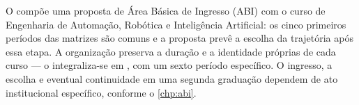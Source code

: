 O \ppccurso compõe uma proposta de Área Básica de Ingresso (ABI) com o curso de Engenharia de Automação, Robótica e Inteligência Artificial: os cinco primeiros períodos das matrizes são comuns e a proposta prevê a escolha da trajetória após essa etapa. A organização preserva a duração e a identidade próprias de cada curso — o \ppccurso integraliza-se em \ppctempominimo, com um sexto período específico. O ingresso, a escolha e eventual continuidade em uma segunda graduação dependem de ato institucional específico, conforme o \autoref{chp:abi}.
